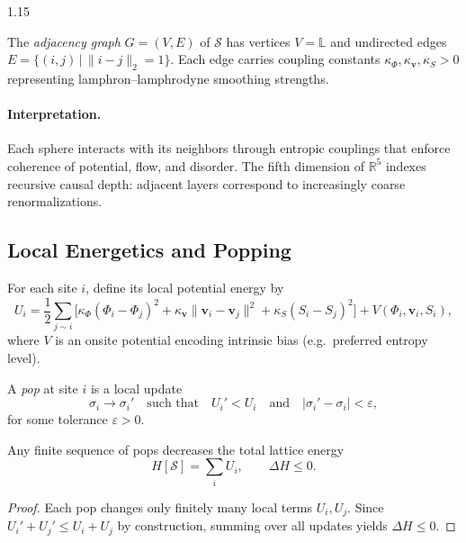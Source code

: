 \documentclass[12pt,a4paper]{article}
\begin{document}
\begin{spacing}{1.15}
\begin{definition}
\label{def:adjacency}
The \emph{adjacency graph} $G=(V,E)$ of $\mathcal{S}$ has vertices
$V=\mathbb{L}$ and undirected edges
$E=\{(i,j)\,|\,\|i-j\|_2=1\}$.
Each edge carries coupling constants
$\kappa_\Phi,\kappa_{\mathbf{v}},\kappa_S>0$
representing lamphron--lamphrodyne smoothing strengths.
\end{definition}

\paragraph{Interpretation.}
Each sphere interacts with its neighbors through entropic
couplings that enforce coherence of potential, flow, and disorder.
The fifth dimension of $\mathbb{R}^5$ indexes recursive causal depth:
adjacent layers correspond to increasingly coarse renormalizations.

\subsection{Local Energetics and Popping}

\begin{definition}
\label{def:potential}
For each site $i$, define its local potential energy by
\[
  U_i = \frac{1}{2}\!\sum_{j\sim i}\!
    \Big[\kappa_\Phi(\Phi_i-\Phi_j)^2
        +\kappa_{\mathbf{v}}\|\mathbf{v}_i-\mathbf{v}_j\|^2
        +\kappa_S(S_i-S_j)^2\Big]
        +V(\Phi_i,\mathbf{v}_i,S_i),
\]
where $V$ is an onsite potential encoding intrinsic bias
(e.g.\ preferred entropy level).
\end{definition}

\begin{definition}
\label{def:pop}
A \emph{pop} at site $i$ is a local update
\[
  \sigma_i \longrightarrow \sigma_i'
  \quad\text{such that}\quad
  U_i' < U_i
  \quad\text{and}\quad
  |\sigma_i'-\sigma_i| < \varepsilon,
\]
for some tolerance $\varepsilon>0$.
\end{definition}

\begin{proposition}
\label{prop:descent}
Any finite sequence of pops decreases the total lattice energy
\[
  H[\mathcal{S}] = \sum_i U_i,
\qquad
  \Delta H \le 0.
\]
\end{proposition}

\begin{proof}
Each pop changes only finitely many local terms $U_i,U_j$.
Since $U_i'+U_j'\le U_i+U_j$ by construction,
summing over all updates yields $\Delta H\le0$.
\end{proof}


\end{spacing}
\end{document}
